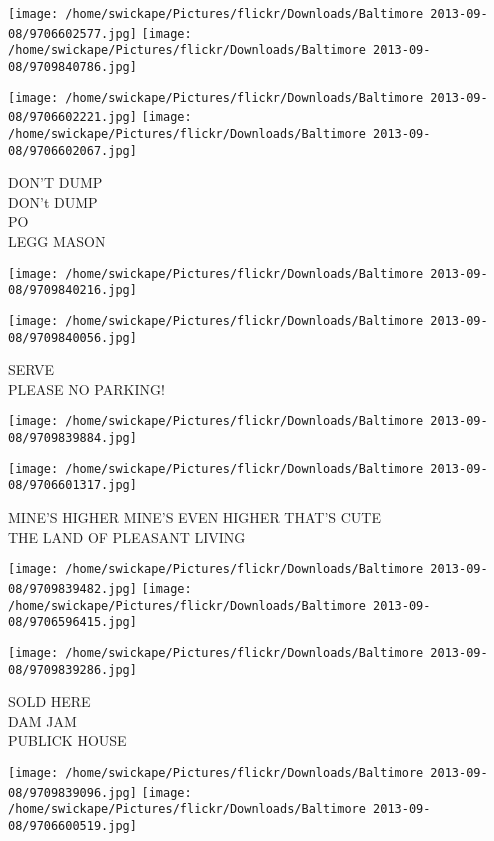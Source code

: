 \documentclass[10pt,letterpaper]{article}
\begin{document}
\texttt{[image: /home/swickape/Pictures/flickr/Downloads/Baltimore 2013-09-08/9706602577.jpg]}
\texttt{[image: /home/swickape/Pictures/flickr/Downloads/Baltimore 2013-09-08/9709840786.jpg]}

\texttt{[image: /home/swickape/Pictures/flickr/Downloads/Baltimore 2013-09-08/9706602221.jpg]}
\texttt{[image: /home/swickape/Pictures/flickr/Downloads/Baltimore 2013-09-08/9706602067.jpg]}

DON'T DUMP\\
DON't DUMP\\
PO\\
LEGG MASON
\pagebreak

\texttt{[image: /home/swickape/Pictures/flickr/Downloads/Baltimore 2013-09-08/9709840216.jpg]}

\vspace{0.25in}
\texttt{[image: /home/swickape/Pictures/flickr/Downloads/Baltimore 2013-09-08/9709840056.jpg]}

SERVE\\
PLEASE NO PARKING!
\pagebreak

\texttt{[image: /home/swickape/Pictures/flickr/Downloads/Baltimore 2013-09-08/9709839884.jpg]}

\vspace{0.25in}
\texttt{[image: /home/swickape/Pictures/flickr/Downloads/Baltimore 2013-09-08/9706601317.jpg]}

MINE'S HIGHER MINE'S EVEN HIGHER THAT'S CUTE\\
THE LAND OF PLEASANT LIVING
\pagebreak

\texttt{[image: /home/swickape/Pictures/flickr/Downloads/Baltimore 2013-09-08/9709839482.jpg]}
\texttt{[image: /home/swickape/Pictures/flickr/Downloads/Baltimore 2013-09-08/9706596415.jpg]}

\vspace{0.25in}
\texttt{[image: /home/swickape/Pictures/flickr/Downloads/Baltimore 2013-09-08/9709839286.jpg]}

SOLD HERE\\
DAM JAM\\
PUBLICK HOUSE
\pagebreak

\texttt{[image: /home/swickape/Pictures/flickr/Downloads/Baltimore 2013-09-08/9709839096.jpg]}
\texttt{[image: /home/swickape/Pictures/flickr/Downloads/Baltimore 2013-09-08/9706600519.jpg]}
\end{document}
